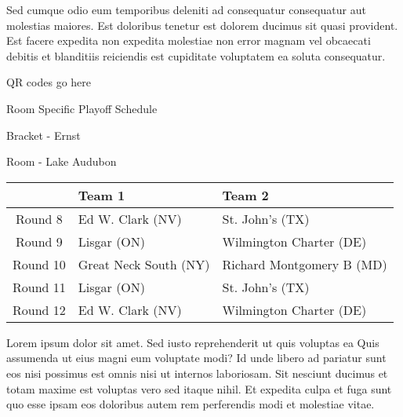 \documentclass{article}%
\begin{document}
\newline%
Sed cumque odio eum temporibus deleniti ad consequatur consequatur aut molestias maiores. Est doloribus tenetur est dolorem ducimus sit quasi provident. Est facere expedita non expedita molestiae non error magnam vel obcaecati debitis et blanditiis reiciendis est cupiditate voluptatem ea soluta consequatur.%
\vspace*{140pt}%
\begin{center}%
\begin{Huge}%
QR codes go here%
\end{Huge}%
\end{center}%
\newpage%
\begin{center}%
\begin{Huge}%
Room Specific Playoff Schedule%
\end{Huge}%
\vspace*{8pt}%
\linebreak%
\begin{Large}%
Bracket {-} Ernst%
\end{Large}%
\vspace*{8pt}%
\linebreak%
\vspace*{8pt}%
\begin{Large}%
Room {-} Lake Audubon%
\end{Large}%
\end{center}%
%
\begin{tabularx}{\textwidth}{|c|Y|Y|}%
\hline%
&Team 1&Team 2\\%
\hline%
Round 8&Ed W. Clark (NV)&St. John's (TX)\\%
Round 9&Lisgar (ON)&Wilmington Charter (DE)\\%
Round 10&Great Neck South (NY)&Richard Montgomery B (MD)\\%
Round 11&Lisgar (ON)&St. John's (TX)\\%
Round 12&Ed W. Clark (NV)&Wilmington Charter (DE)\\%
\hline%
\end{tabularx}%
\vspace*{8pt}%
\newline%
Lorem ipsum dolor sit amet. Sed iusto reprehenderit ut quis voluptas ea Quis assumenda ut eius magni eum voluptate modi? Id unde libero ad pariatur sunt eos nisi possimus est omnis nisi ut internos laboriosam. Sit nesciunt ducimus et totam maxime est voluptas vero sed itaque nihil. Et expedita culpa et fuga sunt quo esse ipsam eos doloribus autem rem perferendis modi et molestiae vitae.\newline%
\end{document}
